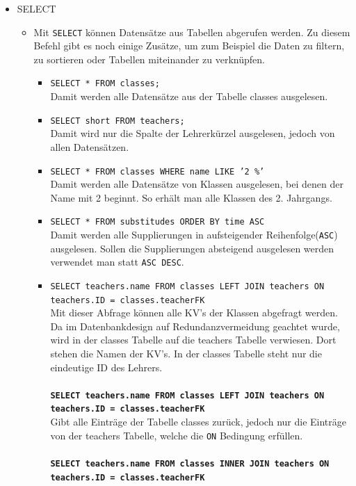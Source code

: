 \begin{itemize}
    \item SELECT
    	\begin{itemize}
	    	\item Mit \texttt{SELECT} können Datensätze aus Tabellen abgerufen werden. Zu diesem Befehl gibt es noch einige Zusätze, um zum Beispiel die Daten zu filtern, zu sortieren oder Tabellen miteinander zu verknüpfen.
	    	\begin{itemize}
		    	\item \texttt{SELECT * FROM classes;}\\
		    		Damit werden alle Datensätze aus der Tabelle classes ausgelesen.
		    	\item \texttt{SELECT short FROM teachers;}\\
			    	Damit wird nur die Spalte der Lehrerkürzel ausgelesen, jedoch von allen Datensätzen.
		    	\item \texttt{SELECT * FROM classes WHERE name LIKE '2 \%'}\\
		    		Damit werden alle Datensätze von Klassen ausgelesen, bei denen der Name mit 2 beginnt. So erhält man alle Klassen des 2. Jahrgangs.
		    	\item \texttt{SELECT * FROM substitudes ORDER BY time ASC}\\
		    		Damit werden alle Supplierungen in aufsteigender Reihenfolge(\texttt{ASC}) ausgelesen. Sollen die Supplierungen absteigend ausgelesen werden verwendet man statt \texttt{ASC DESC}.
		    	\item \texttt{SELECT teachers.name FROM classes LEFT JOIN teachers ON \\teachers.ID = classes.teacherFK}\\
		    		Mit dieser Abfrage können alle KV's der Klassen abgefragt werden. Da im Datenbankdesign auf Redundanzvermeidung geachtet wurde, wird in der classes Tabelle auf die teachers Tabelle verwiesen. Dort stehen die Namen der KV's. In der classes Tabelle steht nur die eindeutige ID des Lehrers.\\\\
		    		\textbf{\texttt{SELECT teachers.name FROM classes LEFT JOIN teachers ON \\teachers.ID = classes.teacherFK}}\\
		    			Gibt alle Einträge der Tabelle classes zurück, jedoch nur die Einträge von der teachers Tabelle, welche die \texttt{ON} Bedingung erfüllen.\\\\
		    		\textbf{\texttt{SELECT teachers.name FROM classes INNER JOIN teachers ON \\teachers.ID = classes.teacherFK}}\\

\end{itemize}
\end{itemize}
\end{itemize}
